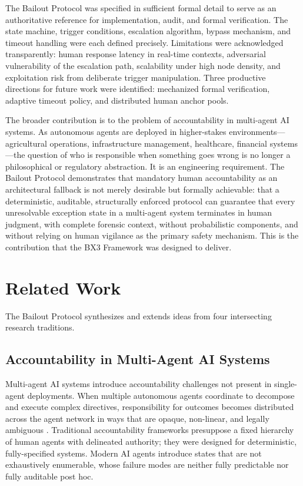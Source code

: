 \documentclass[12pt]{article}
\begin{document}
The Bailout Protocol was specified in sufficient formal detail to serve as an authoritative reference for implementation, audit, and formal verification. The state machine, trigger conditions, escalation algorithm, bypass mechanism, and timeout handling were each defined precisely. Limitations were acknowledged transparently: human response latency in real-time contexts, adversarial vulnerability of the escalation path, scalability under high node density, and exploitation risk from deliberate trigger manipulation. Three productive directions for future work were identified: mechanized formal verification, adaptive timeout policy, and distributed human anchor pools.

The broader contribution is to the problem of accountability in multi-agent AI systems. As autonomous agents are deployed in higher-stakes environments---agricultural operations, infrastructure management, healthcare, financial systems---the question of who is responsible when something goes wrong is no longer a philosophical or regulatory abstraction. It is an engineering requirement. The Bailout Protocol demonstrates that mandatory human accountability as an architectural fallback is not merely desirable but formally achievable: that a deterministic, auditable, structurally enforced protocol can guarantee that every unresolvable exception state in a multi-agent system terminates in human judgment, with complete forensic context, without probabilistic components, and without relying on human vigilance as the primary safety mechanism. This is the contribution that the BX3 Framework was designed to deliver.


\section{Related Work}\label{sec:related}
The Bailout Protocol synthesizes and extends ideas from four intersecting research traditions.

\subsection{Accountability in Multi-Agent AI Systems}
Multi-agent AI systems introduce accountability challenges not present in single-agent deployments. When multiple autonomous agents coordinate to decompose and execute complex directives, responsibility for outcomes becomes distributed across the agent network in ways that are opaque, non-linear, and legally ambiguous \citep{bansal2019}. Traditional accountability frameworks presuppose a fixed hierarchy of human agents with delineated authority; they were designed for deterministic, fully-specified systems. Modern AI agents introduce states that are not exhaustively enumerable, whose failure modes are neither fully predictable nor fully auditable post hoc.
\end{document}
